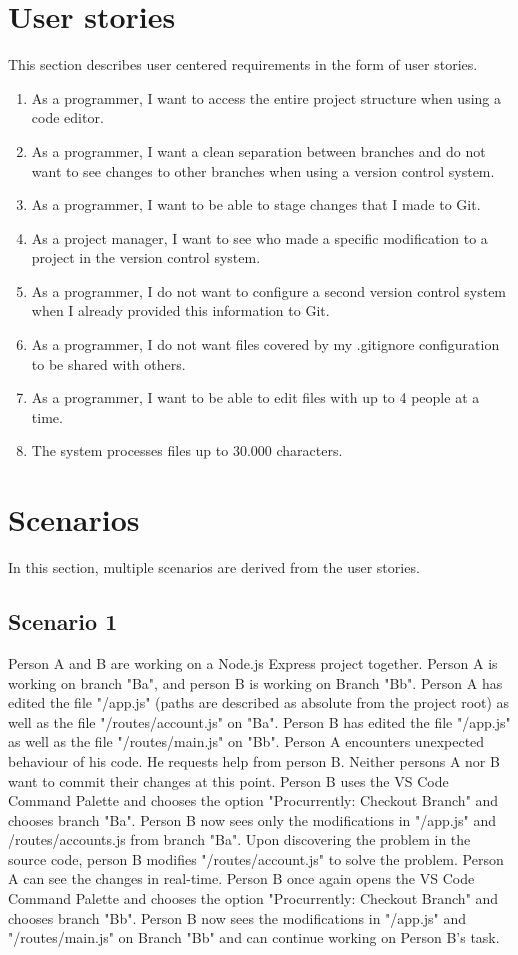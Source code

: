 \section{User stories}
This section describes user centered requirements in the form of user stories.
\begin{enumerate}
\item As a programmer, I want to access the entire project structure when using a code editor.
\item As a programmer, I want a clean separation between branches and do not want to see changes to other branches when using a version control system.
\item As a programmer, I want to be able to stage changes that I made to Git.
\item As a project manager, I want to see who made a specific modification to a project in the version control system.
\item As a programmer, I do not want to configure a second version control system when I already provided this information to Git.
\item As a programmer, I do not want files covered by my .gitignore configuration to be shared with others.
\item As a programmer, I want to be able to edit files with up to 4 people at a time. 
\item The system processes files up to 30.000 characters.
\end{enumerate}

\section{Scenarios}
\label{sec:scenarios}
In this section, multiple scenarios are derived from the user stories.

\subsection{Scenario 1}
\label{sec:scenario1}
Person A and B are working on a Node.js Express project together. Person A is working on branch "Ba", and person B is working on Branch "Bb".
Person A has edited the file "/app.js" (paths are described as absolute from the project root) as well as the file "/routes/account.js" on "Ba".
Person B has edited the file "/app.js" as well as the file "/routes/main.js" on "Bb".
Person A encounters unexpected behaviour of his code. He requests help from person B.
Neither persons A nor B want to commit their changes at this point.
Person B uses the VS Code Command Palette and chooses the option "Procurrently: Checkout Branch" and chooses branch "Ba".
Person B now sees only the modifications in "/app.js" and /routes/accounts.js from branch "Ba".
Upon discovering the problem in the source code, person B modifies "/routes/account.js" to solve the problem.
Person A can see the changes in real-time.
Person B once again opens the VS Code Command Palette and chooses the option "Procurrently: Checkout Branch" and chooses branch "Bb".
Person B now sees the modifications in "/app.js" and "/routes/main.js" on Branch "Bb" and can continue working on Person B's task.


